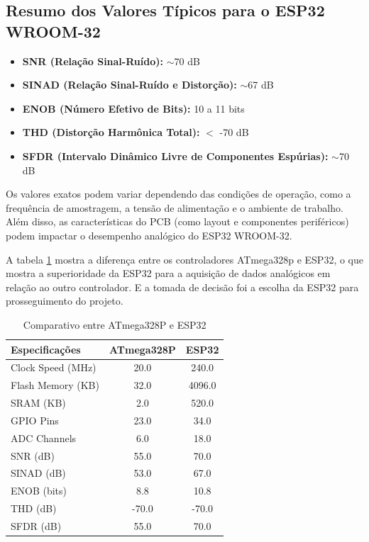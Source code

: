 \subsection{Resumo dos Valores Típicos para o ESP32 WROOM-32}
\begin{itemize}
    \item \textbf{SNR (Relação Sinal-Ruído):} $\sim$70 dB
    \item \textbf{SINAD (Relação Sinal-Ruído e Distorção):} $\sim$67 dB
    \item \textbf{ENOB (Número Efetivo de Bits):} 10 a 11 bits
    \item \textbf{THD (Distorção Harmônica Total):} $<$ -70 dB
    \item \textbf{SFDR (Intervalo Dinâmico Livre de Componentes Espúrias):} $\sim$70 dB
\end{itemize}

Os valores exatos podem variar dependendo das condições de operação, como a frequência de amostragem, a tensão de alimentação e o ambiente de trabalho. Além disso, as características do PCB (como layout e componentes periféricos) podem impactar o desempenho analógico do ESP32 WROOM-32.

A tabela \ref{tab:comparativo} mostra a diferença entre os controladores ATmega328p e ESP32, o que mostra a superioridade da ESP32 para a aquisição de dados analógicos em relação ao outro controlador.  E a tomada de decisão foi a escolha da ESP32 para prosseguimento do projeto. 

\begin{table}[h!]
\centering
\begin{tabular}{|l|c|c|}
\hline
\textbf{Especificações} & \textbf{ATmega328P} & \textbf{ESP32} \\ \hline
Clock Speed (MHz)       & 20.0                & 240.0          \\ \hline
Flash Memory (KB)       & 32.0                & 4096.0         \\ \hline
SRAM (KB)               & 2.0                 & 520.0          \\ \hline
GPIO Pins               & 23.0                & 34.0           \\ \hline
ADC Channels            & 6.0                 & 18.0           \\ \hline
SNR (dB)                & 55.0                & 70.0           \\ \hline
SINAD (dB)              & 53.0                & 67.0           \\ \hline
ENOB (bits)             & 8.8                 & 10.8           \\ \hline
THD (dB)                & -70.0               & -70.0          \\ \hline
SFDR (dB)               & 55.0                & 70.0           \\ \hline
\end{tabular}
\caption{Comparativo entre ATmega328P e ESP32}
\label{tab:comparativo}
\end{table}


